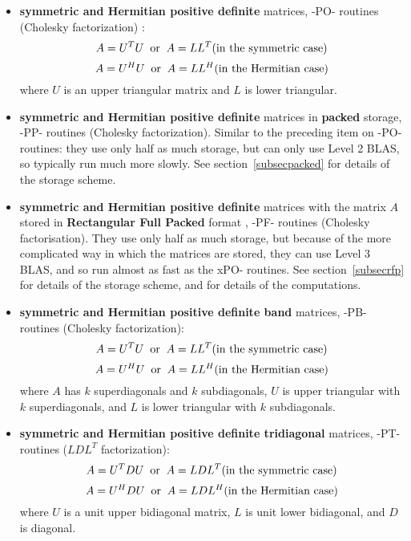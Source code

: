 \begin{itemize}
\item {\bf symmetric and Hermitian positive definite} matrices, -PO- routines (Cholesky factorization)
:
\[ A = U^{T}U \; \; {\rm or}\; \; A = LL^{T} \mbox{(in the symmetric case)}\]
\[ A = U^{H}U \; \; {\rm or}\; \; A = LL^{H} \mbox{(in the Hermitian case)}\]
where $U$ is an upper triangular matrix and $L$ is lower triangular.

\item {\bf symmetric and Hermitian positive definite} matrices in {\bf packed} storage, -PP- routines
(Cholesky factorization).
Similar to the preceding item on -PO- routines: they use only half as much storage, but can only use Level 2 BLAS,
so typically run much more slowly.
See section~\ref{subsecpacked} for details of the storage scheme.

\item {\bf symmetric and Hermitian positive definite} matrices with the matrix $A$
stored in {\bf Rectangular Full Packed} format
, -PF- routines
(Cholesky factorisation).
They use only half as much storage, but because of the more complicated way in which the matrices are stored,
they can use Level 3 BLAS, and so run almost as fast as the xPO- routines.
See section~\ref{subsecrfp} for details of the storage scheme,
and \cite{gustavsonetal08} for details of the computations.

\item {\bf symmetric and Hermitian positive definite band} matrices, -PB- routines (Cholesky factorization):
\[ A = U^{T}U \; \; {\rm or}\; \; A = LL^{T} \mbox{(in the symmetric case)}\]
\[ A = U^{H}U \; \; {\rm or}\; \; A = LL^{H} \mbox{(in the Hermitian case)}\]
where $A$ has $k$ superdiagonals and $k$ subdiagonals, 
$U$ is upper triangular with $k$ superdiagonals, and $L$ is lower triangular with $k$ subdiagonals.

\item {\bf symmetric and Hermitian positive definite tridiagonal} matrices, -PT- routines ($L D
L^{T}$ factorization):
\[ A = U^{T} D U \; \; {\rm or}\; \; A = L D L^{T} \mbox{(in the symmetric case)}\]
\[ A = U^{H} D U \; \; {\rm or}\; \; A = L D L^{H} \mbox{(in the Hermitian case)}\]
where $U$ is a unit upper bidiagonal matrix, $L$ is unit lower
bidiagonal, and $D$ is diagonal.

\end{itemize}

